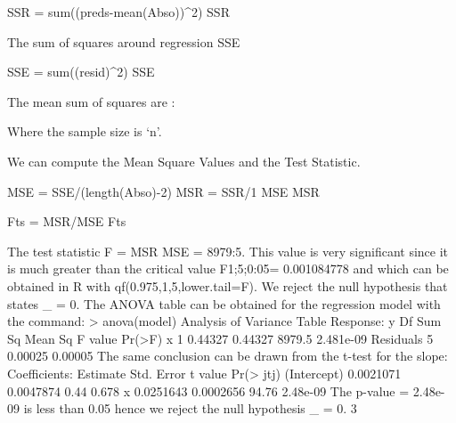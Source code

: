 SSR = sum((preds-mean(Abso))^2)
SSR



The sum of squares around regression SSE

SSE = sum((resid)^2)
SSE



The mean sum of squares are :



Where the sample size is ‘n’.

We can compute the Mean Square Values and the Test Statistic.

MSE = SSE/(length(Abso)-2)
MSR = SSR/1
MSE
MSR

Fts = MSR/MSE
Fts




The test statistic F = MSR
MSE = 8979:5. This value is very significant since it is much greater than the
critical value F1;5;0:05= 0.001084778 and which can be obtained in R with qf(0.975,1,5,lower.tail=F).
We reject the null hypothesis that states _ = 0.
The ANOVA table can be obtained for the regression model with the command: > anova(model)
Analysis of Variance Table
Response: y
Df Sum Sq Mean Sq F value Pr(>F)
x 1 0.44327 0.44327 8979.5 2.481e-09
Residuals 5 0.00025 0.00005
The same conclusion can be drawn from the t-test for the slope:
Coefficients:
Estimate Std. Error t value Pr(> jtj)
(Intercept) 0.0021071 0.0047874 0.44 0.678
x 0.0251643 0.0002656 94.76 2.48e-09
The p-value = 2.48e-09 is less than 0.05 hence we reject the null hypothesis _ = 0.
3
